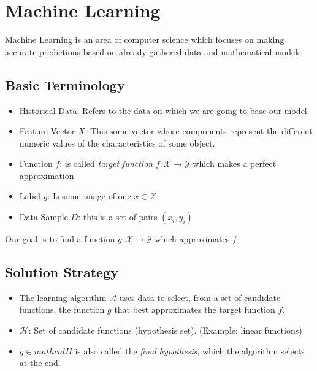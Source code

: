\newpage
\section{Machine Learning}

Machine Learning is an area of computer science which focuses on making accurate 
predictions based on already gathered data and mathematical models.

\subsection{Basic Terminology}

\begin{itemize}

    \item Historical Data: Refers to the data on which we are going to base our model. 

    \item Feature Vector \(X\): This some vector whose components represent the different numeric values of the characteristics 
    of some object.

    \item Function \(f\): is called \emph{target function} \(f: \mathcal{X} \to \mathcal{Y}\) which makes a perfect approximation 

    \item Label \(y\): Is some image of one \(x \in \mathcal{X}\) 

    \item Data Sample \(D\): this is a set of pairs \((x_i, y_i)\)

\end{itemize}

Our goal is to find a function \(g: \mathcal{X} \to \mathcal{Y}\) which approximates \(f\)

\subsection{Solution Strategy}

\begin{itemize}

    \item The learning algorithm \(\mathcal{A}\) uses data to select, from a set of candidate functions, the function \( g \) that best approximates the target function \(f\).

    \item \( \mathcal{H} \): Set of candidate functions (hypothesis set). (Example: linear functions)

    \item \( g \in mathcal{H} \) is also called the \emph{final hypothesis}, which the algorithm selects at the end.

\end{itemize}

